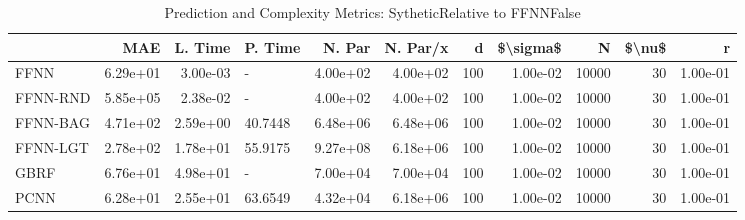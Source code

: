 \begin{table}
\centering
\caption{Prediction and Complexity Metrics: SytheticRelative to FFNNFalse}
\label{tab__Sythetic__Fix_Neurons_QTrue}
\begin{tabular}{lrrlrrrrrrr}
\toprule
{} &      MAE &  L. Time &  P. Time &   N. Par &  N. Par/x &    d &  \$\textbackslash sigma\$ &      N &  \$\textbackslash nu\$ &        r \\
\midrule
FFNN     & 6.29e+01 & 3.00e-03 &        - & 4.00e+02 &  4.00e+02 &  100 &  1.00e-02 &  10000 &     30 & 1.00e-01 \\
FFNN-RND & 5.85e+05 & 2.38e-02 &        - & 4.00e+02 &  4.00e+02 &  100 &  1.00e-02 &  10000 &     30 & 1.00e-01 \\
FFNN-BAG & 4.71e+02 & 2.59e+00 &  40.7448 & 6.48e+06 &  6.48e+06 &  100 &  1.00e-02 &  10000 &     30 & 1.00e-01 \\
FFNN-LGT & 2.78e+02 & 1.78e+01 &  55.9175 & 9.27e+08 &  6.18e+06 &  100 &  1.00e-02 &  10000 &     30 & 1.00e-01 \\
GBRF     & 6.76e+01 & 4.98e+01 &        - & 7.00e+04 &  7.00e+04 &  100 &  1.00e-02 &  10000 &     30 & 1.00e-01 \\
PCNN     & 6.28e+01 & 2.55e+01 &  63.6549 & 4.32e+04 &  6.18e+06 &  100 &  1.00e-02 &  10000 &     30 & 1.00e-01 \\
\bottomrule
\end{tabular}
\end{table}
